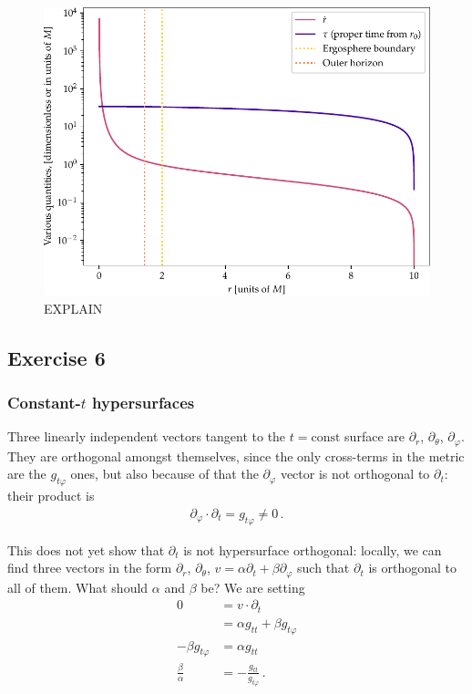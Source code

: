 \documentclass[main.tex]{subfiles}
\begin{document}
\begin{figure}[ht]
\centering
\includegraphics[width=.9\textwidth]{figures/kerr_infall}
\caption{EXPLAIN}
\label{fig:kerr_infall}
\end{figure}

\subsection{Exercise 6}

\subsubsection{Constant-$t$ hypersurfaces}

Three linearly independent vectors tangent to the \(t = \text{const}\) surface are \(\partial_r\), \(\partial_\theta \), \(\partial_\varphi \). 
They are orthogonal amongst themselves, since the only cross-terms in the metric are the \(g_{t \varphi }\) ones, but also because of that the \(\partial_\varphi \) vector is not orthogonal to \(\partial_t\): their product is %
\begin{align}
\partial_\varphi \cdot \partial_t = g_{t \varphi} \neq 0
\,.
\end{align}

This does not yet show that \(\partial_t\) is not hypersurface orthogonal: locally, we can find three vectors in the form \(\partial_r\), 
\(\partial_\theta \), \(v = \alpha \partial_t + \beta \partial_\varphi\) such that \(\partial_t\) is orthogonal to all of them. 
What should \(\alpha \) and \(\beta \) be? 
We are setting 
%
\begin{align}
0 &= v \cdot \partial_t \\
&= \alpha g_{tt} + \beta g_{t \varphi }  \\
- \beta g_{t \varphi } &= \alpha g_{tt}   \\
\frac{\beta }{\alpha} &= - \frac{ g_{t t }}{g_{t \varphi }}
\,.
\end{align}
\end{document}

